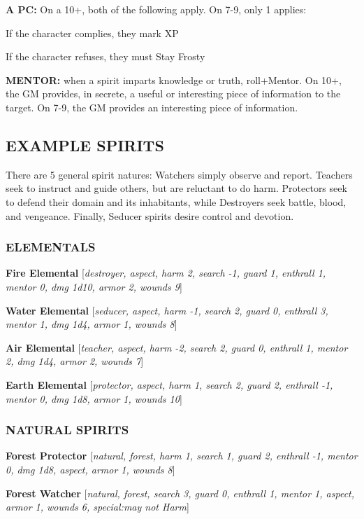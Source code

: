 \documentclass[oneside,10pt]{article}
\begin{document}
\begin{multicols}{2}
\begin{adjustwidth*}{.5cm}{.5cm}
\textbf{A PC:} On a 10+, both of the following apply. On 7-9,
only 1 applies:
\begin{adjustwidth*}{.5cm}{.5cm}
\tcirc{} If the character complies, they mark XP

\tcirc{} If the character refuses, they must Stay Frosty
\end{adjustwidth*}
\end{adjustwidth*}

\textbf{MENTOR:} when a spirit imparts knowledge or truth, roll+Mentor. On 10+, the GM provides, in secrete, a useful or
interesting piece of information to the target. On 7-9, the GM
provides an interesting piece of information.

\subsection{EXAMPLE SPIRITS}
There are 5 general spirit natures: Watchers simply observe
and report. Teachers seek to instruct and guide others, but
are reluctant to do harm. Protectors seek to defend their domain and its inhabitants, while Destroyers seek battle, blood,
and vengeance. Finally, Seducer spirits desire control and
devotion.

\subsubsection{ELEMENTALS}
\textbf{Fire Elemental} [\textit{destroyer, aspect, harm 2, search -1, guard
1, enthrall 1, mentor 0, dmg 1d10, armor 2, wounds
9}]

\textbf{Water Elemental} [\textit{seducer, aspect, harm -1, search 2, guard
0, enthrall 3, mentor 1, dmg 1d4, armor 1, wounds
8}]

\textbf{Air Elemental} [\textit{teacher, aspect, harm -2, search 2, guard 0,
enthrall 1, mentor 2, dmg 1d4, armor 2, wounds 7}]

\textbf{Earth Elemental} [\textit{protector, aspect, harm 1, search 2, guard
2, enthrall -1, mentor 0, dmg 1d8, armor 1, wounds
10}]

\subsubsection{NATURAL SPIRITS}
\textbf{Forest Protector} [\textit{natural, forest, harm 1, search 1, guard 2,
enthrall -1, mentor 0, dmg 1d8, aspect, armor 1,
wounds 8}]

\textbf{Forest Watcher} [\textit{natural, forest, search 3, guard 0, enthrall
1, mentor 1, aspect, armor 1, wounds 6, special:may not
Harm}]


\end{multicols}
\end{document}
